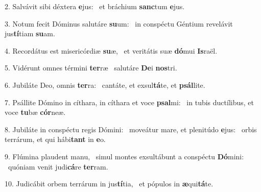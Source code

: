 2. Salvávit sibi déxtera \textbf{e}jus: \ast\  et bráchium \textbf{sanc}tum \textbf{e}jus.\

3. Notum fecit Dóminus salutáre \textbf{su}um: \ast\  in conspéctu Géntium revelávit jus\textbf{tí}tiam \textbf{su}am.\

4. Recordátus est misericórdiæ \textbf{su}æ, \ast\  et veritátis suæ \textbf{dó}mui \textbf{Is}raël.\

5. Vidérunt omnes términi \textbf{ter}ræ \ast\  salutáre \textbf{De}i \textbf{nos}tri.\

6. Jubiláte Deo, omnis \textbf{ter}ra: \ast\  cantáte, et exsul\textbf{tá}te, et \textbf{psál}lite.\

7. Psállite Dómino in cíthara, in cíthara et voce \textbf{psal}mi: \ast\  in tubis ductílibus, et voce \textbf{tu}bæ \textbf{cór}neæ.\

8. Jubiláte in conspéctu regis Dómini: \dag\  moveátur mare, et plenitúdo \textbf{e}jus: \ast\  orbis terrárum, et qui hábi\textbf{tant} in \textbf{e}o.\

9. Flúmina plaudent manu, \dag\  simul montes exsultábunt a conspéctu \textbf{Dó}mini: \ast\  quóniam venit judi\textbf{cá}re \textbf{ter}ram.\

10. Judicábit orbem terrárum in jus\textbf{tí}tia, \ast\  et pópulos in \textbf{æ}qui\textbf{tá}te.\


